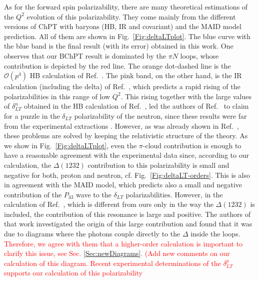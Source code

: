 \documentclass[twocolumn,prc,showpacs,nofootinbib,preprintnumbers,amsmath,amssymb,superscriptaddress]{revtex4-1}
\begin{document}
As for the forward spin polarizability, there are many theoretical estimations of the $Q^2$ evolution of this polarizability.
They come mainly from the different versions of ChPT with baryons (HB, IR and covariant) and the MAID model prediction.
All of them are shown in Fig.~\ref{Fig:deltaLTplot}.
The blue curve with the blue band is the final result (with its error) obtained in this work.
One observes that our BChPT result is dominated by the $\pi N$ loops, whose contribution is depicted by the red line.
The orange dot-dashed line is the  $\mathcal{O}(p^4)$ HB calculation of Ref.~\cite{Kao:2002cp}. 
The pink band, on the other hand, is the IR calculation (including the delta) of Ref.~\cite{Bernard:2002pw}, which predicts a rapid rising of the polarizabilities in this range of low $Q^2$. 
This rising together with the large values of $\delta_{LT}^n$ obtained in the HB calculation of Ref.~\cite{Kao:2002cp}, led the authors of Ref.~\cite{Kochelev:2011bh} to claim for a puzzle in the $\delta_{LT}$ polarizability of the neutron, since these results were far from the experimental extractions \cite{Amarian:2004yf}.
However, as was already shown in Ref.~\cite{Bernard:2012hb}, these problems are solved by keeping the relativistic structure of the theory.
As we show in Fig.~\ref{Fig:deltaLTplot}, even the $\pi$-cloud contribution is enough to have a reasonable agreement with the experimental data since, according to our calculation, the $\Delta(1232)$ contribution to this polarizability is small and negative for both, proton and neutron, cf. Fig.~\ref{Fig:deltaLT-orders}. 
This is also in agreement with the MAID model, which predicts also a small and negative contribution of the $P_{33}$ wave to the $\delta_{LT}$ polarizabilities.
However, in the calculation of Ref.~\cite{Bernard:2012hb}, which is different from ours only in the way the $\Delta(1232)$ is included, the contribution of this resonance is large and positive.
The authors of that work investigated the origin of this large contribution and found that it was due to diagrams where the photons couple directly to the $\Delta$ inside the loops. 
\textcolor{red}{Therefore, we agree with them that a higher-order calculation is important to clarify this issue, see Sec. \ref{Sec:newDiagrams}. (Add new comments on our calculation of this diagram.}
\textcolor{red}{Recent experimental determinations of the $\delta_{LT}^p$ supports our calculation of this polarizability}
\end{document}
